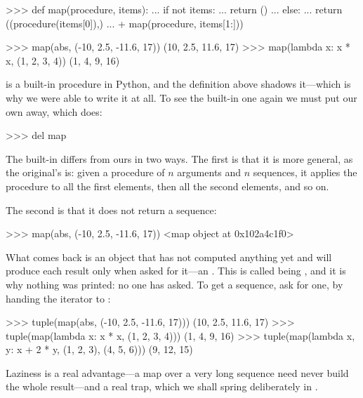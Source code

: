 \begin{codeBlock}
>>> def map(procedure, items):
...     if not items:
...         return ()
...     else:
...         return ((procedure(items[0]),)
...                 + map(procedure, items[1:]))

>>> map(abs, (-10, 2.5, -11.6, 17))
(10, 2.5, 11.6, 17)
>>> map(lambda x: x * x, (1, 2, 3, 4))
(1, 4, 9, 16)
\end{codeBlock}

\noindent
\begin{revealTheSurface}
 is a built-in procedure in Python, and the definition above shadows
it---which is why we were able to write it at all.  To see the built-in one
again we must put our own away, which  does:

\begin{codeBlock}
>>> del map
\end{codeBlock}

\noindent
The built-in  differs from ours in two ways.  The first is that it is
more general, as the original's is: given a procedure of \( n \) arguments and
\( n \) sequences, it applies the procedure to all the first elements, then all
the second elements, and so on.

The second is that it does not return a sequence:

\begin{codeBlock}
>>> map(abs, (-10, 2.5, -11.6, 17))
<map object at 0x102a4c1f0>
\end{codeBlock}

\noindent
What comes back is an object that has not computed anything yet and will
produce each result only when asked for it---an .  This is
called being , and it is why nothing was printed: no one has
asked.  To get a sequence, ask for one, by handing the iterator to
:

\begin{codeBlock}
>>> tuple(map(abs, (-10, 2.5, -11.6, 17)))
(10, 2.5, 11.6, 17)
>>> tuple(map(lambda x: x * x, (1, 2, 3, 4)))
(1, 4, 9, 16)
>>> tuple(map(lambda x, y: x + 2 * y, (1, 2, 3), (4, 5, 6)))
(9, 12, 15)
\end{codeBlock}

\noindent
Laziness is a real advantage---a map over a very long sequence need never build
the whole result---and a real trap, which we shall spring deliberately in
.
\end{revealTheSurface}


